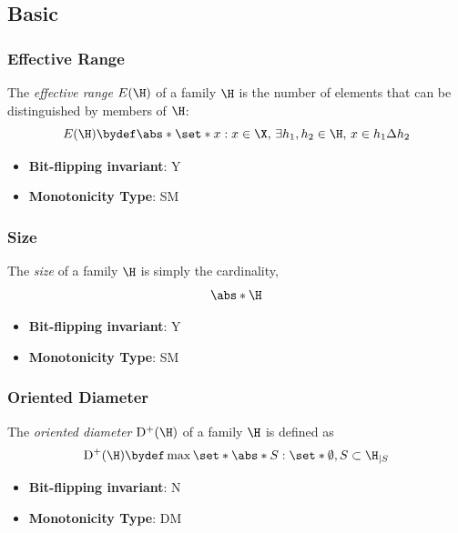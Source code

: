 \subsection{Basic}\label{sec:Basic}
\subsubsection{Effective Range}

      \begin{definition}\label{def:effective_range}
      The {\em effective range} $E(\H)$ of a family $\H$ is the number of elements that can be distinguished by members of $\H$: \[ E(\H)\bydef \abs*{\set*{x:x\in\X,\, \exists h_1,h_2\in\H,\, x\in h_1 \Delta h_2}} \]
      \end{definition}
      \begin{itemize}
      \item {\bf Bit-flipping invariant}: Y
      \item {\bf Monotonicity Type}: SM
      \end{itemize}
\subsubsection{Size}

      \begin{definition}\label{def:size}
      The {\em size} of a family $\H$ is simply the  cardinality, \[  \abs*{\H} \]
      \end{definition}
      \begin{itemize}
      \item {\bf Bit-flipping invariant}: Y
      \item {\bf Monotonicity Type}: SM
      \end{itemize}
\subsubsection{Oriented Diameter}
      
      \begin{definition}\label{def:oriented_diameter}
      The {\em oriented diameter} $\mathrm{D}^+(\H)$ of a family $\H$ is defined as \[ \mathrm{D}^+(\H)\bydef \max\set*{\abs*{S}: \set*{\emptyset, S}\subset \H_{|S}} \]
      \end{definition}
      \begin{itemize}
      \item {\bf Bit-flipping invariant}: N
      \item {\bf Monotonicity Type}: DM
      \end{itemize}
